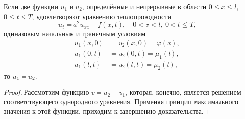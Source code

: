 \begin{theorem}[единственности]
  Если две функции $ u_1 $ и $ u_2 $, определённые и непрерывные в области $
  0\leqslant x\leqslant l $, $ 0 \leqslant t \leqslant T $, удовлетворяют
  уравнению теплопроводности  
  \[
    u_t = a^2 u_{xx} + f(x, t), \quad 0 < x < l, \ 0 < t \leqslant T,
  \]
  одинаковым начальным и граничным условиям  
  \begin{align*}
    u_1(x, 0) &= u_2(x, 0) = \varphi(x),\\
    u_1(0, t) &= u_2(0, t) = \mu_1(t),\\
    u_1(l, t) &= u_2(l, t) = \mu_2(t),
  \end{align*}
  то $ u_1 = u_2 $.
\end{theorem}

\begin{proof}
  Рассмотрим функцию $ v = u_2 - u_1 $, которая, конечно, является решением
  соответствующего однородного уравнения. Применяя принцип максимального
  значения к этой функции, приходим к завершению доказательства.
\end{proof}
  
